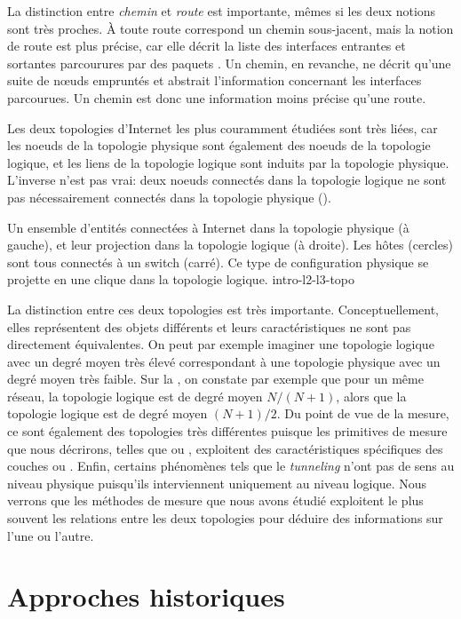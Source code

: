 La distinction entre {\em chemin} et {\em route} est importante, mêmes si les
deux notions sont très proches. À toute route correspond un chemin sous-jacent,
mais la notion de route est plus précise, car elle décrit la liste des
interfaces entrantes et sortantes parcourures par des paquets \ip. Un chemin, en
revanche, ne décrit qu'une suite de n\oe{}uds empruntés et abstrait
l'information concernant les interfaces parcourues. Un chemin est donc une
information moins précise qu'une route.

Les deux topologies d'Internet les plus couramment étudiées sont très liées, car
les noeuds de la topologie physique sont également des noeuds de la topologie
logique, et les liens de la topologie logique sont induits par la topologie
physique. L'inverse n'est pas vrai: deux noeuds connectés dans la topologie
logique ne sont pas nécessairement connectés dans la topologie physique
().

 {Un ensemble d'entités connectées à Internet dans la topologie
physique (à gauche), et leur projection dans la topologie logique (à droite).
Les hôtes (cercles) sont tous connectés à un switch (carré). Ce type de
configuration physique se projette en une clique dans la topologie logique.}
{intro-l2-l3-topo}

La distinction entre ces deux topologies est très importante. Conceptuellement,
elles représentent des objets différents et leurs caractéristiques ne sont pas
directement équivalentes. On peut par exemple imaginer une topologie logique
avec un degré moyen très élevé correspondant à une topologie physique avec un
degré moyen très faible. Sur la , on constate par
exemple que pour un même réseau, la topologie logique est de degré moyen
$N/(N+1)$, alors que la topologie logique est de degré moyen $(N+1)/2$. Du point
de vue de la mesure, ce sont également des topologies très différentes puisque
les primitives de mesure que nous décrirons, telles que \traceroute ou \ping,
exploitent des caractéristiques spécifiques des couches \LL ou \LLL. Enfin,
certains phénomènes tels que le {\em tunneling} n'ont pas de sens au
niveau physique puisqu'ils interviennent uniquement au niveau logique. Nous
verrons que les méthodes de mesure que nous avons étudié exploitent le plus
souvent les relations entre les deux topologies pour déduire des informations
sur l'une ou l'autre.


\section{Approches historiques}

